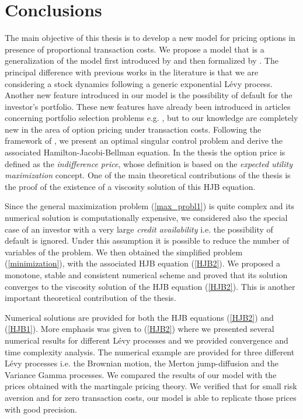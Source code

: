 
\chapter{Conclusions}\label{Conclusions}


\vspace{5em}




The main objective of this thesis is to develop a new model for pricing options in presence of proportional transaction costs.
We propose a model that is a generalization of the model first introduced by \cite{HoNe89} and then formalized by \cite{DaPaZa93}.
The principal difference with previous works in the literature is that we are considering a stock dynamics following a generic exponential Lévy process.
Another new feature introduced in our model is the possibility of default for the investor's portfolio. These new features have already been introduced in articles 
concerning portfolio selection problems e.g. \cite{Kab16}, but to our knowledge are completely new in the area of option pricing under transaction costs.
Following the framework of \cite{Kab16}, we present an optimal singular control problem and derive the associated Hamilton-Jacobi-Bellman equation.
In the thesis the option price is defined as the \emph{indifference price}, whose definition is based on the \emph{expected utility maximization} concept.
One of the main theoretical contributions of the thesis is the proof of the existence of a viscosity solution 
of this HJB equation. 

Since the general maximization problem (\ref{max_probl1}) is quite complex and its numerical solution is computationally expensive,
we considered also the special case of an investor with a very large \emph{credit availability} i.e. the possibility of default is ignored.
Under this assumption it is possible to reduce the number of variables of the problem. We then obtained the simplified problem (\ref{minimization}), 
with the associated HJB equation (\ref{HJB2}).
We proposed a monotone, stable and consistent numerical scheme and proved that its solution converges to the viscosity solution of the
HJB equation (\ref{HJB2}). This is another important theoretical contribution of the thesis.

Numerical solutions are provided for both the HJB equations (\ref{HJB2}) and (\ref{HJB1}). 
More emphasis was given to (\ref{HJB2}) where we presented several numerical results for different Lévy processes and we provided convergence and time complexity 
analysis.
The numerical example are provided for three different Lévy processes i.e. the Brownian motion, the Merton jump-diffusion and the Variance Gamma processes. 
We compared the results of our model with the prices obtained with the martingale pricing theory.
We verified that for small risk aversion and for zero transaction costs, our model is able to replicate those prices with good precision.


